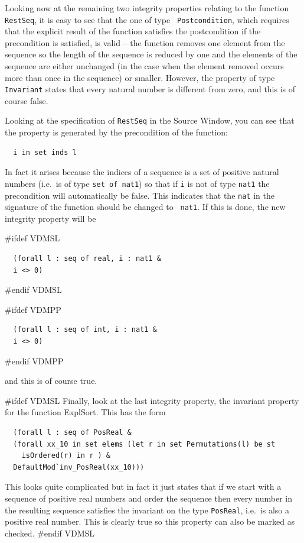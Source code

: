 \documentclass[\pformat,12pt]{article}
\newcommand{\aaa}{\tt }
\newcommand{\guicmd}[1]{{\sf #1}}
\newcommand{\guicmd}[1]{{\gt #1}}
\begin{document}
Looking now at the remaining two integrity
properties relating to the 
function {\aaa RestSeq}, it is easy to see that the one of type {\aaa
  Postcondition}, which requires that the explicit result of the
function satisfies the postcondition if the precondition is satisfied,
is valid -- the function removes one element from the sequence so the
length of the sequence is reduced by one and the elements of the
sequence are either unchanged (in the case when the element removed
occurs more than once in the sequence) or smaller. However, the
property of type {\aaa Invariant} states that every natural number is
different from zero, and this is of course false.

Looking at the specification of {\aaa RestSeq} in the \guicmd{Source
  Window}, you can see that the property is generated by the
  precondition of the function:

\begin{verbatim}
  i in set inds l
\end{verbatim}

In fact it arises because the indices of a sequence is a set of
positive natural numbers (i.e.\ is of type 
\verb+set of nat1+) so that if {\aaa i} is not of type {\aaa nat1} the 
precondition will automatically be false. This indicates that the
{\aaa nat} in the signature of the function should be changed to {\aaa
  nat1}. If this is done, the new integrity property will be 

#ifdef VDMSL
\begin{verbatim}
  (forall l : seq of real, i : nat1 &
  i <> 0)
\end{verbatim}
#endif VDMSL

#ifdef VDMPP
\begin{verbatim}
  (forall l : seq of int, i : nat1 &
  i <> 0)
\end{verbatim}
#endif VDMPP

and this is of course true.

#ifdef VDMSL
Finally, look at the last integrity property, the invariant property
for the function \guicmd{ExplSort}. This has the form
\begin{verbatim}
  (forall l : seq of PosReal &
  (forall xx_10 in set elems (let r in set Permutations(l) be st 
    isOrdered(r) in r ) &
  DefaultMod`inv_PosReal(xx_10)))
\end{verbatim}

This looks quite complicated but in fact it just states that if we
start with a sequence of positive real numbers and order the sequence
then every number in the resulting sequence satisfies the invariant on
the type {\aaa PosReal}, i.e.\ is also a positive real number. This is
clearly true so this property can also be marked as checked.
#endif VDMSL
\end{document}
